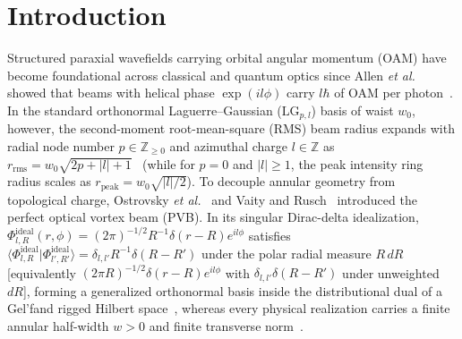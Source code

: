 \documentclass[aps,pra,onecolumn,notitlepage,11pt,tightenlines,nofootinbib,floatfix,longbibliography]{revtex4-2}
\theoremstyle{remark}
\newcommand{\braket}[2]{\langle #1 | #2 \rangle}
\newcommand{\abs}[1]{\lvert #1 \rvert}
\begin{document}
\maketitle

\section{Introduction}
\label{sec:intro}

Structured paraxial wavefields carrying orbital angular momentum (OAM) have become foundational across classical and quantum optics since Allen \emph{et al.} showed that beams with helical phase $\exp(il\phi)$ carry $l\hbar$ of OAM per photon~\cite{Allen1992,Siegman1986,Padgett2011,Erhard2018}. In the standard orthonormal Laguerre--Gaussian ($\mathrm{LG}_{p,l}$) basis of waist $w_0$, however, the second-moment root-mean-square (RMS) beam radius expands with radial node number $p \in \mathbb{Z}_{\ge 0}$ and azimuthal charge $l \in \mathbb{Z}$ as $r_{\mathrm{rms}} = w_0\sqrt{2p+\abs{l}+1}$~\cite{Allen1992,Siegman1986} (while for $p = 0$ and $\abs{l} \ge 1$, the peak intensity ring radius scales as $r_{\mathrm{peak}} = w_0\sqrt{\abs{l}/2}$). To decouple annular geometry from topological charge, Ostrovsky \emph{et al.}~\cite{Ostrovsky2013} and Vaity and Rusch~\cite{Vaity2015} introduced the perfect optical vortex beam (PVB). In its singular Dirac-delta idealization, $\Phi_{l,R}^{\mathrm{ideal}}(r,\phi) = (2\pi)^{-1/2} R^{-1}\delta(r-R)e^{il\phi}$ satisfies $\braket{\Phi_{l,R}^{\mathrm{ideal}}}{\Phi_{l',R'}^{\mathrm{ideal}}} = \delta_{l,l'} R^{-1}\delta(R-R')$ under the polar radial measure $R\,dR$ [equivalently $(2\pi R)^{-1/2}\delta(r-R)e^{il\phi}$ with $\delta_{l,l'}\delta(R-R')$ under unweighted $dR$], forming a generalized orthonormal basis inside the distributional dual of a Gel'fand rigged Hilbert space~\cite{Gelfand1964}, whereas every physical realization carries a finite annular half-width $w > 0$ and finite transverse norm~\cite{Vaity2015,Reddy2016}.
\end{document}

